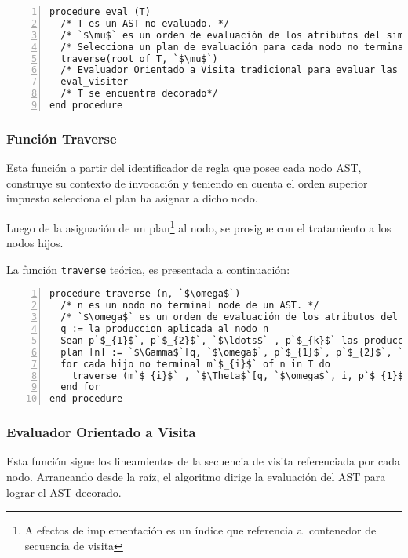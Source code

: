 \documentclass[runningheads,a4paper]{llncs}
\begin{document}
\begin{lstlisting}[numbers=left]
procedure eval (T)
  /* T es un AST no evaluado. */
  /* `$\mu$` es un orden de evaluación de los atributos del simbolo inicial. */
  /* Selecciona un plan de evaluación para cada nodo no terminal en T. */
  traverse(root of T, `$\mu$`)
  /* Evaluador Orientado a Visita tradicional para evaluar las instancias de atributos de T.*/
  eval_visiter 
  /* T se encuentra decorado*/
end procedure
\end{lstlisting}

\subsubsection{Función Traverse}

Esta función a partir del identificador de regla que posee cada nodo AST, construye su contexto de invocación y teniendo en cuenta el orden superior impuesto selecciona el plan ha asignar a dicho nodo.

Luego de la asignación de un plan\footnote{A efectos de implementación es un índice que referencia al contenedor de secuencia de visita} al nodo, se prosigue con el tratamiento a los nodos hijos.

La función \texttt{traverse} teórica, es presentada a continuación:

\begin{lstlisting}[numbers=left]
procedure traverse (n, `$\omega$`)
  /* n es un nodo no terminal node de un AST. */
  /* `$\omega$` es un orden de evaluación de los atributos del simbolo no terminal de mas a izquierda localizado en n. */
  q := la produccion aplicada al nodo n
  Sean p`$_{1}$`, p`$_{2}$`, `$\ldots$` , p`$_{k}$` las producciones aplicadas a los nodos hijos no terminales de n.
  plan [n] := `$\Gamma$`[q, `$\omega$`, p`$_{1}$`, p`$_{2}$`, `$\ldots$` , p`$_{k}$`]
  for cada hijo no terminal m`$_{i}$` of n in T do
    traverse (m`$_{i}$` , `$\Theta$`[q, `$\omega$`, i, p`$_{1}$`, p`$_{2}$`, `$\ldots$` , p`$_{k}$`])
  end for
end procedure
\end{lstlisting}

\subsubsection{Evaluador Orientado a Visita}

Esta función sigue los lineamientos de la secuencia de visita referenciada por cada nodo. Arrancando desde la raíz, el algoritmo dirige la evaluación del AST para lograr el AST decorado.
\end{document}
